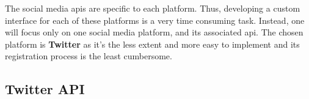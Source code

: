 The social media \glspl{api} are specific to each platform. Thus, developing a
custom interface for each of these platforms is a very time consuming
task. Instead, one will focus only on one social media platform, and its
associated \gls{api}. The chosen platform is \textbf{Twitter} as it's the less
extent and more easy to implement and its registration process is the least cumbersome.

\subsection{Twitter API}
\label{sec:twitter-api}





